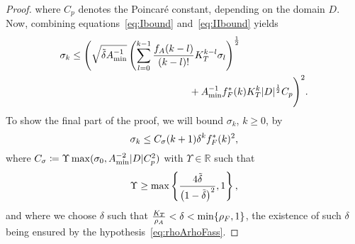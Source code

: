 \begin{proof}
	where $C_p$ denotes the Poincar\'e constant, depending on the domain $D$.
	Now, combining equations~\eqref{eq:Ibound} and~\eqref{eq:IIbound} yields
	\begin{align}
		\sigma_k &\leq    \Bigg(\sqrt{ {\tilde{\delta}}  A_{\min}^{-1}}  \left( \sum_{l=0}^{k-1}\frac{f_A(k-l)}{(k-l)!}K_T ^{k-l}  \sigma_l\right)^{\frac{1}{2}} \nonumber\\
		&\qquad\qquad\qquad\qquad\qquad\qquad+  A_{\min}^{-1} f^*_F(k) K_T^k   |D|^{\frac{1}{2}}   C_p     \Bigg)^2.  \label{eq:squaredsigmakbound}
	\end{align}
	To show the final part of the proof, we will bound $\sigma_k$, $k\geq 0$, by
	\begin{equation}
		\sigma_k \leq C_{\sigma} (k+1) \delta^k f^*_F(k)^2,  \label{eq:sigmaineq}
	\end{equation}
	where $C_{\sigma} \coloneqq \Upsilon  \max(\sigma_0, A_{\min}^{-2} |D|C_p^2)$ with  $\Upsilon\in\mathbb{R}$ such that
	\begin{align}
		\Upsilon \geq \max\left\{\frac{4{\tilde{\delta}} }{\left(1-{\tilde{\delta}}\right)^2}, 1\right\}, \label{eq:Nepsbound}
	\end{align}
	and where we choose $\delta$ such that $\frac{K_T}{\rho_A} < \delta < \min\{\rho_F,1\}$,
	the existence of such $\delta$ being ensured by the hypothesis~\eqref{eq:rhoArhoFass}.


\end{proof}
